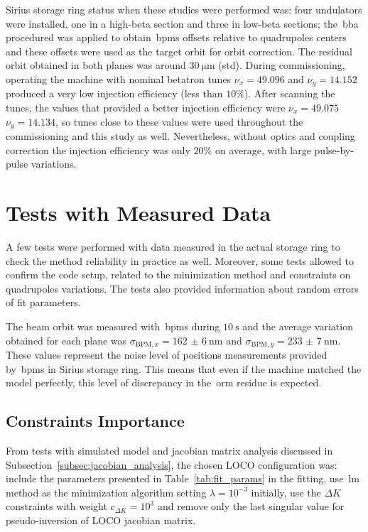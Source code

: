 Sirius storage ring status when these studies were performed was: four undulators were installed, one in a high-beta section and three in low-beta sections; the~\gls{bba} procedured was applied to obtain~\glspl{bpm} offsets relative to quadrupoles centers and these offsets were used as the target orbit for orbit correction. The residual orbit obtained in both planes was around $\SI{30}{\micro\meter}$ (\gls{std}). During commissioning, operating the machine with nominal betatron tunes $\nu_x = 49.096$ and $\nu_y = 14.152$ produced a very low injection efficiency (less than $10\%$). After scanning the tunes, the values that provided a better injection efficiency were $\nu_x = 49.075$ $\nu_y = 14.134$, so tunes close to these values were used throughout the commissioning and this study as well. Nevertheless, without optics and coupling correction the injection efficiency was only $20\%$ on average, with large pulse-by-pulse variations.
\section{Tests with Measured Data}\label{sec:tests_measured}
A few tests were performed with data measured in the actual storage ring to check the method reliability in practice as well. Moreover, some tests allowed to confirm the code setup, related to the minimization method and constraints on quadrupoles variations. The tests also provided information about random errors of fit parameters.

The beam orbit was measured with~\glspl{bpm} during $\SI{10}{\second}$ and the average variation obtained for each plane was $\sigma_{\mathrm{BPM}, x} = \SI{162(6)}{\nano\meter}$ and $\sigma_{\mathrm{BPM}, y} = \SI{233(7)}{\nano\meter}$. These values represent the noise level of positions measurements provided by~\glspl{bpm} in Sirius storage ring. This means that even if the machine matched the model perfectly, this level of discrepancy in the~\gls{orm} residue is expected.

\subsection{Constraints Importance}\label{subsec:loco_config}
From tests with simulated model and jacobian matrix analysis discussed in Subsection~\ref{subsec:jacobian_analysis}, the chosen LOCO configuration was: include the parameters presented in Table~\ref{tab:fit_params} in the fitting, use~\gls{lm} method as the minimization algorithm setting $\lambda = 10^{-3}$ initially, use the $\Delta K$ constraints with weight $c_{\Delta K} = 10^{3}$ and remove only the last singular value for pseudo-inversion of LOCO jacobian matrix. 


